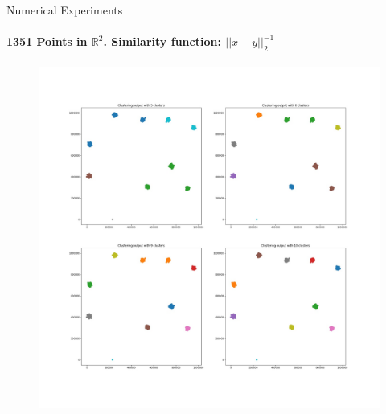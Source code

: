 \documentclass[10pt,a4paper, nocenter]{beamer}
\begin{document}
	\begin{frame}{Numerical Experiments}
		\framesubtitle{1351 Points in $\mathbb{R}^2$. Similarity function: $\lvert\lvert x-y \rvert\rvert_2^{-1}$}
		
		\begin{figure}[h]
			\includegraphics[height=0.80\textheight,trim=0 150 0 150,clip]{../../images/2DCluster.jpg}
			\label{fig:2dresults}
		\end{figure}
	\end{frame}
	
\end{document}
